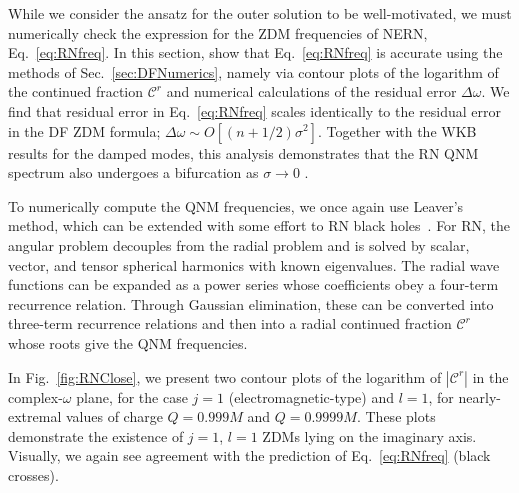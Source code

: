 \begin{refsection}
While we consider the ansatz for the outer solution to be well-motivated, we must numerically check the expression for the ZDM frequencies of NERN, Eq.~\eqref{eq:RNfreq}. 
In this section, show that Eq.~\eqref{eq:RNfreq} is accurate using the methods of Sec.~\ref{sec:DFNumerics}, namely via contour plots of the logarithm of the continued fraction $\mathcal C^r$ and numerical calculations of the residual error $\Delta \omega$. 
We find that residual error in Eq.~\eqref{eq:RNfreq} scales identically to the residual error in the DF ZDM formula; $\Delta \omega \sim O[(n+1/2)\sigma^{2}]$. 
Together with the WKB results for the damped modes, this analysis demonstrates that the RN QNM spectrum also undergoes a bifurcation as $\sigma \to 0$ .

To numerically compute the QNM frequencies, we once again use Leaver's method, which can be extended with some effort to RN black holes~\cite{LeaverRN}. For RN, the angular problem decouples from the radial problem and is solved by scalar, vector, and tensor spherical harmonics with known eigenvalues.  The radial wave functions can be expanded as a power series whose coefficients obey a four-term recurrence relation. Through Gaussian elimination, these can be converted into three-term recurrence relations and then into a radial continued fraction $\mathcal C^r$ whose roots give the QNM frequencies.

In Fig.~\ref{fig:RNClose}, we present two contour plots of the logarithm of $|\mathcal C^r|$ in the complex-$\omega$ plane, for the case $j=1$ (electromagnetic-type) and $l=1$, for nearly-extremal values of charge $Q = 0.999M$ and $Q= 0.9999M$. These plots demonstrate the existence of $j=1$, $l=1$ ZDMs lying on the imaginary axis. Visually, we again see agreement with the prediction of Eq.~\eqref{eq:RNfreq} (black crosses). 


\end{refsection}
